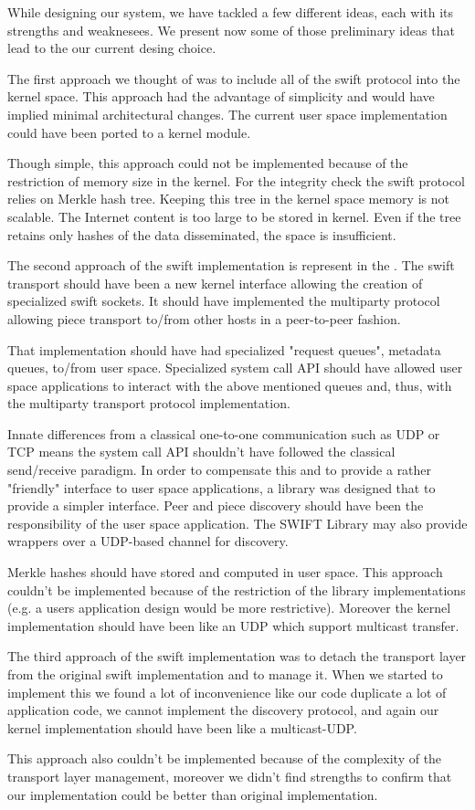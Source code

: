 While designing our system, we have tackled a few different ideas, each with its strengths and weaknesees. We present
now some of those preliminary ideas that lead to the our current desing choice.

The first approach we thought of was to include all of the swift protocol into the kernel space. This
approach had the advantage of simplicity and would have implied minimal architectural changes. The current user space 
implementation could have been ported to a kernel module.

Though simple, this approach could not be implemented because of the restriction of memory size in the kernel.
For the integrity check the swift protocol relies on Merkle hash tree. Keeping this tree in the kernel space memory is
not scalable. The Internet content is too large to be stored in kernel. Even if the tree retains only hashes of the data
disseminated, the space is insufficient.


The second approach of the swift implementation is represent in the . The swift transport 
  should have been a new kernel interface allowing the creation of specialized swift sockets. It
should have implemented the multiparty protocol allowing piece transport to/from other hosts in a peer-to-peer fashion.

That implementation should have had specialized "request queues", metadata queues, to/from user space.  Specialized
system call API should have allowed user space applications to interact with the above
mentioned queues and, thus, with the multiparty transport protocol implementation.

Innate differences from a classical one-to-one communication such as UDP or TCP means the system call API shouldn't have
followed the classical send/receive paradigm. In order to compensate this and to provide a rather "friendly" interface
to user space applications, a library was designed that to provide a simpler interface. Peer and piece discovery should
have been the responsibility of the user space application. The SWIFT Library may also provide wrappers over a UDP-based
channel for discovery. 

Merkle hashes should have stored and computed in user space. This approach couldn't be implemented because of the
restriction of the library implementations (e.g. a users application design would be more restrictive). Moreover the
kernel implementation should have been like an UDP which support multicast transfer.  


The third approach of the swift implementation was to detach the transport layer from the original swift implementation
and to manage it. When we started to implement this we found a lot of inconvenience like our code duplicate a lot of
application code, we cannot implement the discovery protocol, and again our kernel implementation should have been like
a multicast-UDP.

This approach also couldn't be implemented because of the complexity of the transport layer management, moreover we
didn't find strengths to confirm that our implementation could be better than original implementation.